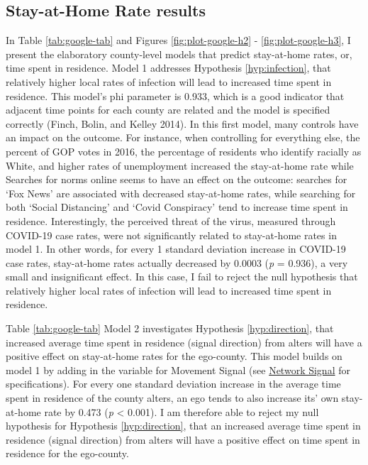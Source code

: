 \hypertarget{stay-at-home-rate-results}{
\subsection{Stay-at-Home Rate results}\label{stay-at-home-rate-results}}




In Table \ref{tab:google-tab} and Figures \ref{fig:plot-google-h2} -
\ref{fig:plot-google-h3}, I present the elaboratory county-level models that
predict stay-at-home rates, or, time spent in residence. Model 1 addresses
Hypothesis \ref{hyp:infection}, that relatively higher local rates of infection
will lead to increased time spent in residence. This model's phi parameter is
0.933, which is a good indicator that adjacent time points for each county are
related and the model is specified correctly (Finch, Bolin, and Kelley 2014). In
this first model, many controls have an impact on the outcome. For instance,
when controlling for everything else, the percent of GOP votes in 2016, the
percentage of residents who identify racially as White, and higher rates of
unemployment increased the stay-at-home rate while Searches for norms online
seems to have an effect on the outcome: searches for `Fox News' are associated
with decreased stay-at-home rates, while searching for both `Social Distancing'
and `Covid Conspiracy' tend to increase time spent in residence. Interestingly,
the perceived threat of the virus, measured through COVID-19 case rates, were
not significantly related to stay-at-home rates in model 1. In other words, for
every 1 standard deviation increase in COVID-19 case rates, stay-at-home rates
actually decreased by 0.0003 (\emph{p} = 0.936), a very small and insignificant
effect. In this case, I fail to reject the null hypothesis that relatively
higher local rates of infection will lead to increased time spent in residence.

Table \ref{tab:google-tab} Model 2 investigates Hypothesis \ref{hyp:direction},
that increased average time spent in residence (signal direction) from alters
will have a positive effect on stay-at-home rates for the ego-county. This model
builds on model 1 by adding in the variable for Movement Signal (see
\protect\hyperlink{network-signal}{Network Signal} for specifications). For
every one standard deviation increase in the average time spent in residence of
the county alters, an ego tends to also increase its' own stay-at-home rate by
0.473 (\emph{p} \textless{} 0.001). I am therefore able to reject my null
hypothesis for Hypothesis \ref{hyp:direction}, that an increased average time
spent in residence (signal direction) from alters will have a positive effect on
time spent in residence for the ego-county.

